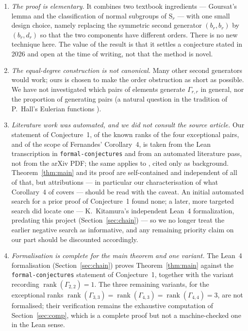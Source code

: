 \documentclass[11pt]{article}
\theoremstyle{plain}
\theoremstyle{definition}
\theoremstyle{remark}
\numberwithin{equation}{section}
\newcommand{\Sym}{\mathrm{S}}
\newcommand{\Gam}{\Gamma}
\DeclareMathOperator{\rank}{rank}
\begin{document}
\begin{enumerate}
\item \emph{The proof is elementary.} It combines two textbook ingredients --- Goursat's lemma
and the classification of normal subgroups of $\Sym_r$ --- with one small design choice, namely
replacing the symmetric second generator $(b_r,b_r)$ by $(b_r,d_r)$ so that the two components
have different orders. There is no new technique here. The value of the result is that it
settles a conjecture stated in 2026 and open at the time of writing, not that the method is
novel.

\item \emph{The equal-degree construction is not canonical.} Many other second generators would
work; ours is chosen to make the order obstruction as short as possible. We have not
investigated which pairs of elements generate $\Gam_{r,r}$ in general, nor the proportion of
generating pairs (a natural question in the tradition of P.~Hall's Eulerian functions
\cite{hall}).

\item \emph{Literature work was automated, and we did not consult the source article.} Our
statement of Conjecture~1, of the known ranks of the four exceptional pairs, and of the scope of
Fernandes' Corollary~4, is taken from the Lean transcription in \texttt{formal-conjectures}
\cite{formalconjectures} and from an automated literature pass, not from the arXiv PDF; the same
applies to \cite{fv}, cited only as background. Theorem~\ref{thm:main} and its proof are
self-contained and independent of all of that, but attributions --- in particular our
characterisation of what Corollary~4 of \cite{fernandes} covers --- should be read with the
caveat. An initial automated search for a prior proof of Conjecture~1 found none; a later, more
targeted search did locate one --- K.~Kitamura's independent Lean~4 formalization, predating this
project (Section~\ref{sec:chain}) --- so we no longer treat the earlier negative search as
informative, and any remaining priority claim on our part should be discounted accordingly.

\item \emph{Formalisation is complete for the main theorem and one variant.} The Lean~4
formalisation (Section~\ref{sec:chain}) proves Theorem~\ref{thm:main} against the
\texttt{formal-conjectures} statement of Conjecture~1, together with the variant recording
$\rank(\Gam_{2,2}) = 1$. The three remaining variants, for the exceptional ranks
$\rank(\Gam_{3,3}) = \rank(\Gam_{4,3}) = \rank(\Gam_{4,4}) = 3$, are not formalised; their
verification remains the exhaustive computation of Section~\ref{sec:comp}, which is a complete
proof but not a machine-checked one in the Lean sense.


\end{enumerate}
\end{document}
